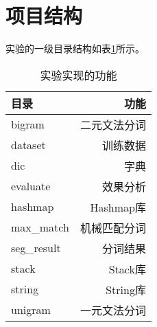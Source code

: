 \section{项目结构}

实验的一级目录结构如表\ref{dir-structure}所示。

\begin{table}[H]
  \centering
  \begin{tabular}{lr}
    \hline
    \textbf{目录} & \textbf{功能} \\
    \hline
    bigram        & 二元文法分词  \\
    dataset       & 训练数据      \\
    dic           & 字典          \\
    evaluate      & 效果分析      \\
    hashmap       & Hashmap库     \\
    max\_match    & 机械匹配分词  \\
    seg\_result   & 分词结果      \\
    stack         & Stack库       \\
    string        & String库      \\
    unigram       & 一元文法分词  \\
    \hline
  \end{tabular}
  \caption{实验实现的功能}
  \label{dir-structure}
\end{table}

